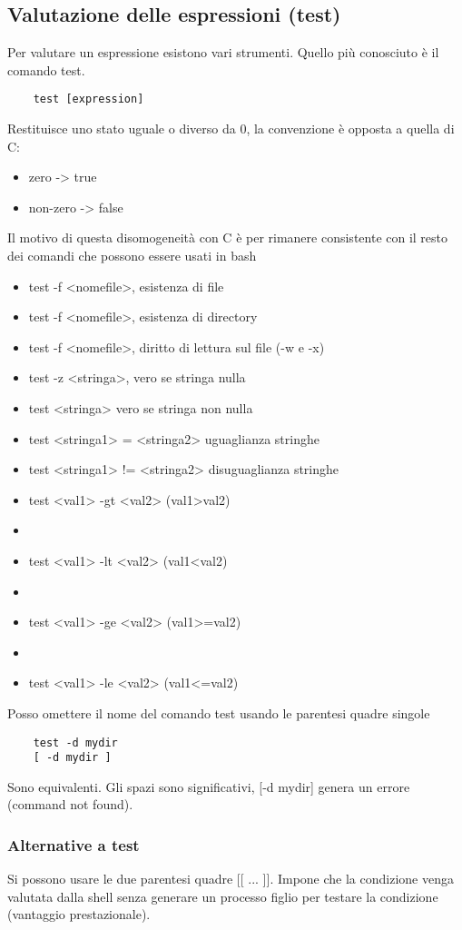 \documentclass
[10pt,        %
 a4paper,     %
 onecolumn,   %
 fleqn,       %
 oneside,     %
 notitlepage, %
 openany      %
]{article}    %
\begin{document}
\subsection{Valutazione delle espressioni (test)}
Per valutare un espressione esistono vari strumenti. Quello più conosciuto è il comando test.
\begin{lstlisting}
    test [expression]
\end{lstlisting}

Restituisce uno stato uguale o diverso da 0, la convenzione è opposta a quella di C:
\begin{itemize}
\item zero -> true
\item non-zero -> false
\end{itemize}
Il motivo di questa disomogeneità con C è per rimanere consistente con il resto dei comandi che possono essere usati in bash

\begin{itemize}
\item test -f <nomefile>, esistenza di file
\item test -f <nomefile>, esistenza di directory
\item test -f <nomefile>, diritto di lettura sul file (-w e -x)
\item test -z <stringa>, vero se stringa nulla
\item test <stringa> vero se stringa non nulla
\item test <stringa1> = <stringa2> uguaglianza stringhe
\item test <stringa1> != <stringa2> disuguaglianza stringhe
\item test <val1> -gt <val2> (val1>val2)
\item \item test <val1> -lt <val2> (val1<val2)
\item \item test <val1> -ge <val2> (val1>=val2)
\item \item test <val1> -le <val2> (val1<=val2)
\end{itemize}

Posso omettere il nome del comando test usando le parentesi quadre singole
\begin{lstlisting}
    test -d mydir
    [ -d mydir ]
\end{lstlisting}
Sono equivalenti. Gli spazi sono significativi, [-d mydir] genera un errore (command not found).

\subsubsection{Alternative a test}
Si possono usare le due parentesi quadre [[ ... ]]. Impone che la condizione venga valutata dalla shell senza generare un processo figlio per testare la condizione (vantaggio prestazionale).
\end{document}
